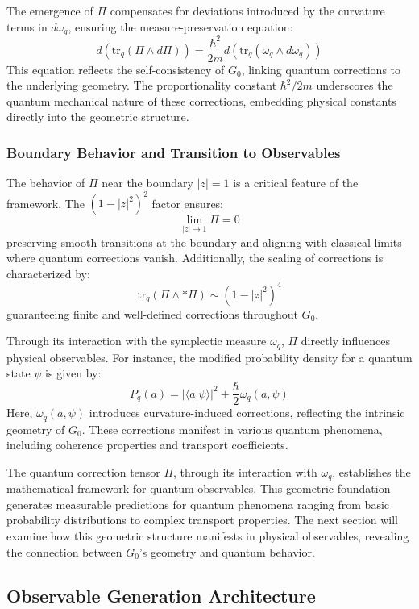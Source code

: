 \documentclass[10pt]{article}
\begin{document}
The emergence of $\Pi$ compensates for deviations introduced by the curvature terms in $d\omega_q$, ensuring the measure-preservation equation:
\[
d\left( \text{tr}_q(\Pi \wedge d\Pi) \right) = \frac{\hbar^2}{2m} d\left( \text{tr}_q(\omega_q \wedge d\omega_q) \right)
\]
This equation reflects the self-consistency of $G_0$, linking quantum corrections to the underlying geometry. The proportionality constant $\hbar^2 / 2m$ underscores the quantum mechanical nature of these corrections, embedding physical constants directly into the geometric structure.

\subsubsection{Boundary Behavior and Transition to Observables}

The behavior of $\Pi$ near the boundary $|z| = 1$ is a critical feature of the framework. The $(1 - |z|^2)^2$ factor ensures:
\[
\lim_{|z| \to 1} \Pi = 0
\]
preserving smooth transitions at the boundary and aligning with classical limits where quantum corrections vanish. Additionally, the scaling of corrections is characterized by:
\[
\text{tr}_q(\Pi \wedge *\Pi) \sim (1 - |z|^2)^4
\]
guaranteeing finite and well-defined corrections throughout $G_0$.

Through its interaction with the symplectic measure $\omega_q$, $\Pi$ directly influences physical observables. For instance, the modified probability density for a quantum state $\psi$ is given by:
\[
P_q(a) = |\langle a | \psi \rangle|^2 + \frac{\hbar}{2}\omega_q(a, \psi)
\]
Here, $\omega_q(a, \psi)$ introduces curvature-induced corrections, reflecting the intrinsic geometry of $G_0$. These corrections manifest in various quantum phenomena, including coherence properties and transport coefficients.

The quantum correction tensor $\Pi$, through its interaction with $\omega_q$, establishes the mathematical framework for quantum observables. This geometric foundation generates measurable predictions for quantum phenomena ranging from basic probability distributions to complex transport properties. The next section will examine how this geometric structure manifests in physical observables, revealing the connection between $G_0$'s geometry and quantum behavior.

\subsection{Observable Generation Architecture}
\end{document}
